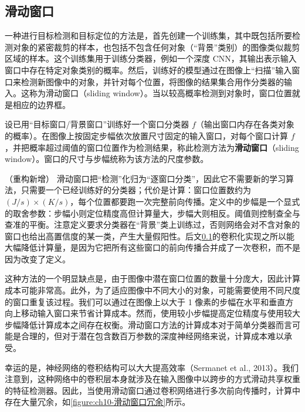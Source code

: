 \documentclass[../../main.tex]{subfiles}
\begin{document}
\subsection{滑动窗口}\label{subsection:ch10-滑动窗口}

一种进行目标检测和目标定位的方法是，首先创建一个训练集，其中既包括所要检测对象的紧密裁剪的样本，也包括不包含任何对象（“背景”类别）的图像类似裁剪区域的样本。这个训练集用于训练分类器，例如一个深度 CNN，其输出表示输入窗口中存在特定对象类别的概率。然后，训练好的模型通过在图像上“扫描”输入窗口来检测新图像中的对象，并针对每个位置，将图像的结果集合用作分类器的输入。这称为滑动窗口（sliding window）。当以较高概率检测到对象时，窗口位置就是相应的边界框。

\begin{definition}[滑动窗口]\label{definition:ch10-滑动窗口}
设已用“目标窗口/背景窗口”训练好一个窗口分类器 $f$（输出窗口内存在各类对象的概率）。在图像上按固定步幅依次放置尺寸固定的输入窗口，对每个窗口计算 $f$，并把概率超过阈值的窗口位置作为检测结果，称此检测方法为\textbf{滑动窗口}（sliding window）。窗口的尺寸与步幅统称为该方法的尺度参数。
\end{definition}

\begin{remark}（重构新增）
滑动窗口把“检测”化归为“逐窗口分类”，因此它不需要新的学习算法，只需要一个已经训练好的分类器；代价是计算：窗口位置数约为 $(J/s)\times(K/s)$，每个位置都要跑一次完整前向传播。定义中的步幅是一个显式的取舍参数：步幅小则定位精度高但计算量大，步幅大则相反。阈值则控制查全与查准的平衡。注意定义要求分类器在“背景”类上训练过，否则网络会对不含对象的窗口也给出高置信度的某一类，产生大量假阳性。后文\cref{subsection:ch10-滑动窗口}的卷积化实现之所以能大幅降低计算量，是因为它把所有这些窗口的前向传播合并成了一次卷积，而不是因为改变了定义。
\end{remark}

这种方法的一个明显缺点是，由于图像中潜在窗口位置的数量十分庞大，因此计算成本可能非常高。此外，为了适应图像中不同大小的对象，可能需要使用不同尺度的窗口重复该过程。我们可以通过在图像上以大于 1 像素的步幅在水平和垂直方向上移动输入窗口来节省计算成本。然而，使用较小步幅提高定位精度与使用较大步幅降低计算成本之间存在权衡。滑动窗口方法的计算成本对于简单分类器而言可能是合理的，但对于潜在包含数百万参数的深度神经网络来说，计算成本难以承受。

幸运的是，神经网络的卷积结构可以大大提高效率（Sermanet et al., 2013）。我们注意到，这种网络中的卷积层本身就涉及在输入图像中以跨步的方式滑动共享权重的特征检测器。因此，当使用滑动窗口通过卷积网络进行多次前向传播时，计算中存在大量冗余，如\cref{figure:ch10-滑动窗口冗余}所示。
\end{document}
